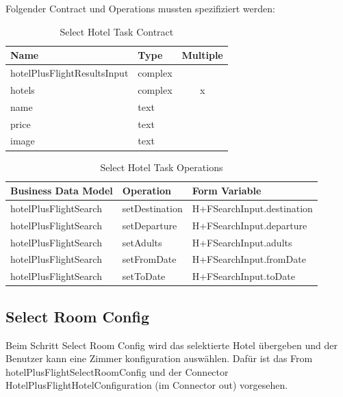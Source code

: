 Folgender Contract und Operations mussten spezifiziert werden:
\begin{table}[H] 
	\caption{Select Hotel Task Contract}
	\centering
	
	\begin{tabular}{ | l | l | c | } 
		\hline
		\textbf{Name} & \textbf{Type} & \textbf{Multiple} \\ \hline 
		hotelPlusFlightResultsInput & complex & \\ \hline
		\hspace*{5mm}hotels & complex & x \\ \hline
		\hspace*{10mm}name & text & \\ \hline
		\hspace*{10mm}price & text & \\ \hline
		\hspace*{10mm}image & text & \\ \hline
	\end{tabular} 
\end{table}
\begin{table}[H] 
	\caption{Select Hotel Task Operations}
	\centering
	
	\begin{tabular}{ | l | l | l | } 
		\hline
		\textbf{Business Data Model} & \textbf{Operation} & \textbf{Form Variable} \\ \hline 
		hotelPlusFlightSearch & setDestination & H+FSearchInput.destination \\ \hline
		hotelPlusFlightSearch & setDeparture & H+FSearchInput.departure \\ \hline
		hotelPlusFlightSearch & setAdults & H+FSearchInput.adults \\ \hline
		hotelPlusFlightSearch & setFromDate & H+FSearchInput.fromDate \\ \hline
		hotelPlusFlightSearch & setToDate & H+FSearchInput.toDate \\ \hline
	\end{tabular} 
\end{table}

\subsection{Select Room Config}
Beim Schritt Select Room Config wird das selektierte Hotel übergeben und der Benutzer kann eine Zimmer konfiguration auswählen. Dafür ist das From hotelPlusFlightSelectRoomConfig und der Connector HotelPlusFlightHotelConfiguration (im Connector out) vorgesehen.

